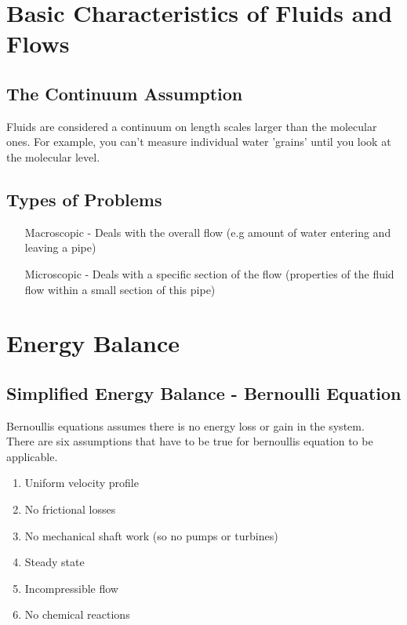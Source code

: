 \documentclass[12pt,a4paper]{article}
\begin{document}
    \newpage

    \section{Basic Characteristics of Fluids and Flows}
        \subsection{The Continuum Assumption}
            Fluids are considered a continuum on length scales larger than the molecular ones. For example, you can't measure individual water 'grains' until you look at the molecular level.
        
        \subsection{Types of Problems}
            \begin{itemize}
                \item[Macroscopic - ] Deals with the overall flow (e.g amount of water entering and leaving a pipe)
                \item[Microscopic - ] Deals with a specific section of the flow (properties of the fluid flow within a small section of this pipe)
            \end{itemize}

\section{Energy Balance}
    \subsection{Simplified Energy Balance - Bernoulli Equation}
        Bernoullis equations assumes there is no energy loss or gain in the system. \\
        There are six assumptions that have to be true for bernoullis equation to be applicable.
        \begin{enumerate}
            \item Uniform velocity profile
            \item No frictional losses
            \item No mechanical shaft work (so no pumps or turbines)
            \item Steady state
            \item Incompressible flow
            \item No chemical reactions
        \end{enumerate}
\end{document}
